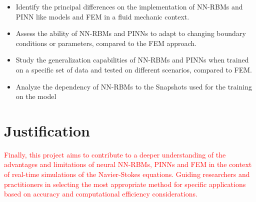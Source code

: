 \documentclass[12pt,letterpaper]{article}
\begin{document}
\begin{itemize}
  \item Identify the principal differences on the implementation of NN-RBMs and PINN like models and FEM in a fluid mechanic context.
  \item Assess the ability of NN-RBMs and PINNs to adapt to changing boundary conditions or parameters, compared to the FEM approach.
  \item  Study the generalization capabilities of NN-RBMs and PINNs when trained on a specific set of data and tested on different scenarios, compared to FEM.
  \item Analyze the dependency of NN-RBMs to the Snapshots used for the training on the model
\end{itemize}

\section{Justification}

\textcolor{red}{ Finally, this project aims to contribute to a deeper understanding of the advantages and limitations of neural NN-RBMs, PINNs and FEM in the context of real-time simulations of the Navier-Stokes equations. Guiding researchers and practitioners in selecting the most appropriate method for specific applications based on accuracy and computational efficiency considerations.}\\
\end{document}
